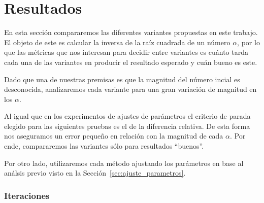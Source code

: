 \section{Resultados}


En esta sección compararemos las diferentes variantes propuestas en este
trabajo. El objeto de este es calcular la inversa de la raíz cuadrada de un
número $\alpha$, por lo que las métricas que nos interesan para decidir entre
variantes es cuánto tarda cada una de las variantes en producir el resultado
esperado y cuán bueno es este.

Dado que una de nuestras premisas es que la magnitud del número incial es
desconocida, analizaremos cada variante para una gran variación de magnitud en
los $\alpha$.

Al igual que en los experimentos de ajustes de parámetros el criterio de parada
elegido para las siguientes pruebas es el de la diferencia relativa. De esta
forma nos aseguramos un error pequeño en relación con la magnitud de cada
$\alpha$. Por ende, compararemos las variantes sólo para resultados ``buenos''.

Por otro lado, utilizaremos cada método ajustando los parámetros en base al
análsis previo visto en la Sección~\ref{sec:ajuste_parametros}.

\subsubsection{Iteraciones}

